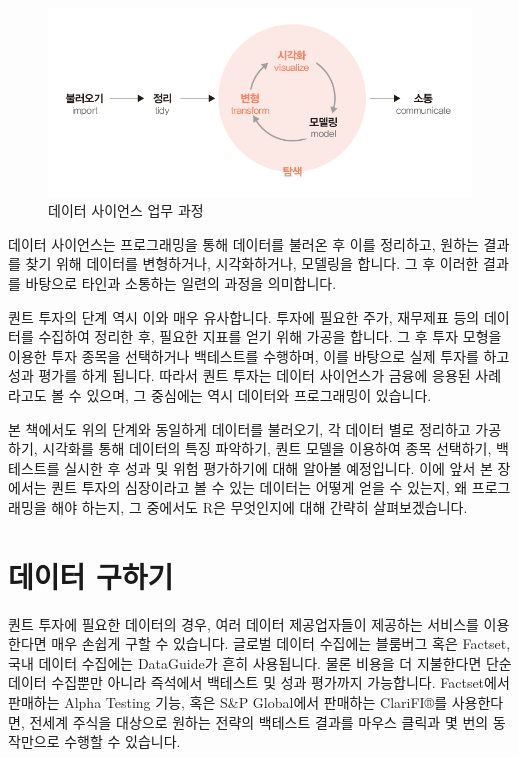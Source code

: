 \documentclass[]{book}
\begin{document}
\begin{figure}

{\centering \includegraphics{images/ds_flow} 

}

\caption{데이터 사이언스 업무 과정}\label{fig:unnamed-chunk-1}
\end{figure}

데이터 사이언스는 프로그래밍을 통해 데이터를 불러온 후 이를 정리하고, 원하는 결과를 찾기 위해 데이터를 변형하거나, 시각화하거나, 모델링을 합니다. 그 후 이러한 결과를 바탕으로 타인과 소통하는 일련의 과정을 의미합니다.

퀀트 투자의 단계 역시 이와 매우 유사합니다. 투자에 필요한 주가, 재무제표 등의 데이터를 수집하여 정리한 후, 필요한 지표를 얻기 위해 가공을 합니다. 그 후 투자 모형을 이용한 투자 종목을 선택하거나 백테스트를 수행하며, 이를 바탕으로 실제 투자를 하고 성과 평가를 하게 됩니다. 따라서 퀀트 투자는 데이터 사이언스가 금융에 응용된 사례라고도 볼 수 있으며, 그 중심에는 역시 데이터와 프로그래밍이 있습니다.

본 책에서도 위의 단계와 동일하게 데이터를 불러오기, 각 데이터 별로 정리하고 가공하기, 시각화를 통해 데이터의 특징 파악하기, 퀀트 모델을 이용하여 종목 선택하기, 백테스트를 실시한 후 성과 및 위험 평가하기에 대해 알아볼 예정입니다. 이에 앞서 본 장에서는 퀀트 투자의 심장이라고 볼 수 있는 데이터는 어떻게 얻을 수 있는지, 왜 프로그래밍을 해야 하는지, 그 중에서도 R은 무엇인지에 대해 간략히 살펴보겠습니다.

\hypertarget{section-2}{%
\section{데이터 구하기}\label{section-2}}

퀀트 투자에 필요한 데이터의 경우, 여러 데이터 제공업자들이 제공하는 서비스를 이용한다면 매우 손쉽게 구할 수 있습니다. 글로벌 데이터 수집에는 블룸버그 혹은 Factset, 국내 데이터 수집에는 DataGuide가 흔히 사용됩니다. 물론 비용을 더 지불한다면 단순 데이터 수집뿐만 아니라 즉석에서 백테스트 및 성과 평가까지 가능합니다. Factset에서 판매하는 Alpha Testing 기능, 혹은 S\&P Global에서 판매하는 ClariFI®를 사용한다면, 전세계 주식을 대상으로 원하는 전략의 백테스트 결과를 마우스 클릭과 몇 번의 동작만으로 수행할 수 있습니다.
\end{document}
